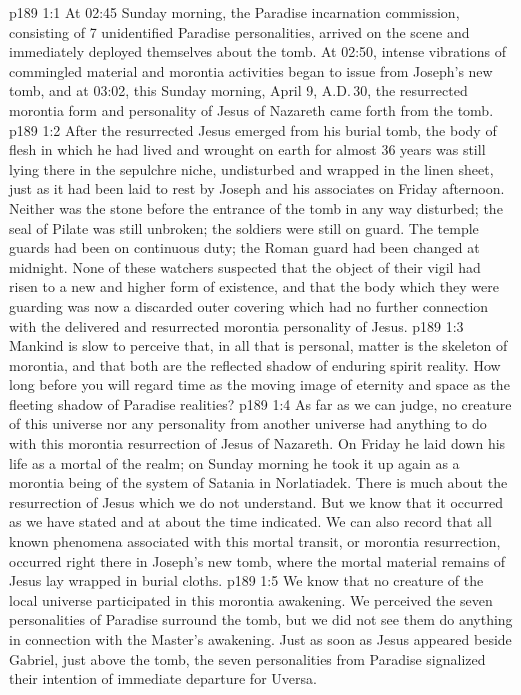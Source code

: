 \vs p189 1:1 At 02:45 Sunday morning, the Paradise incarnation commission, consisting of 7 unidentified Paradise personalities, arrived on the scene and immediately deployed themselves about the tomb. At 02:50, intense vibrations of commingled material and morontia activities began to issue from Joseph’s new tomb, and at 03:02, this Sunday morning, April 9, A.D.\,30, the resurrected morontia form and personality of Jesus of Nazareth came forth from the tomb.
\vs p189 1:2 After the resurrected Jesus emerged from his burial tomb, the body of flesh in which he had lived and wrought on earth for almost 36 years was still lying there in the sepulchre niche, undisturbed and wrapped in the linen sheet, just as it had been laid to rest by Joseph and his associates on Friday afternoon. Neither was the stone before the entrance of the tomb in any way disturbed; the seal of Pilate was still unbroken; the soldiers were still on guard. The temple guards had been on continuous duty; the Roman guard had been changed at midnight. None of these watchers suspected that the object of their vigil had risen to a new and higher form of existence, and that the body which they were guarding was now a discarded outer covering which had no further connection with the delivered and resurrected morontia personality of Jesus.
\vs p189 1:3 \pc Mankind is slow to perceive that, in all that is personal, matter is the skeleton of morontia, and that both are the reflected shadow of enduring spirit reality. How long before you will regard time as the moving image of eternity and space as the fleeting shadow of Paradise realities?
\vs p189 1:4 As far as we can judge, no creature of this universe nor any personality from another universe had anything to do with this morontia resurrection of Jesus of Nazareth. On Friday he laid down his life as a mortal of the realm; on Sunday morning he took it up again as a morontia being of the system of Satania in Norlatiadek. There is much about the resurrection of Jesus which we do not understand. But we know that it occurred as we have stated and at about the time indicated. We can also record that all known phenomena associated with this mortal transit, or morontia resurrection, occurred right there in Joseph’s new tomb, where the mortal material remains of Jesus lay wrapped in burial cloths.
\vs p189 1:5 We know that no creature of the local universe participated in this morontia awakening. We perceived the seven personalities of Paradise surround the tomb, but we did not see them do anything in connection with the Master’s awakening. Just as soon as Jesus appeared beside Gabriel, just above the tomb, the seven personalities from Paradise signalized their intention of immediate departure for Uversa.
